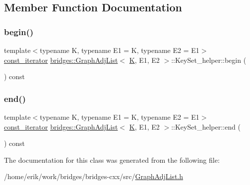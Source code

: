 \subsection{Member Function Documentation}
\mbox{\label{classbridges_1_1_graph_adj_list_1_1_key_set__helper_a13d241840008e50b94b3d12fbd897ebd}} 
\subsubsection{\texorpdfstring{begin()}{begin()}}
{\footnotesize\ttfamily template$<$typename K, typename E1 = K, typename E2 = E1$>$ \\
\hyperlink{classbridges_1_1_graph_adj_list_1_1_key_set__helper_1_1const__iterator}{const\+\_\+iterator} \hyperlink{classbridges_1_1_graph_adj_list}{bridges\+::\+Graph\+Adj\+List}$<$ \hyperlink{namespacebridges_acfb0a4f7877d8f63de3e6862004c50edaa5f3c6a11b03839d46af9fb43c97c188}{K}, E1, E2 $>$\+::Key\+Set\+\_\+helper\+::begin (\begin{DoxyParamCaption}{ }\end{DoxyParamCaption}) const\hspace{0.3cm}{\ttfamily [inline]}}

\mbox{\label{classbridges_1_1_graph_adj_list_1_1_key_set__helper_a581dd1d192896998e9d24bfa694c9036}} 
\subsubsection{\texorpdfstring{end()}{end()}}
{\footnotesize\ttfamily template$<$typename K, typename E1 = K, typename E2 = E1$>$ \\
\hyperlink{classbridges_1_1_graph_adj_list_1_1_key_set__helper_1_1const__iterator}{const\+\_\+iterator} \hyperlink{classbridges_1_1_graph_adj_list}{bridges\+::\+Graph\+Adj\+List}$<$ \hyperlink{namespacebridges_acfb0a4f7877d8f63de3e6862004c50edaa5f3c6a11b03839d46af9fb43c97c188}{K}, E1, E2 $>$\+::Key\+Set\+\_\+helper\+::end (\begin{DoxyParamCaption}{ }\end{DoxyParamCaption}) const\hspace{0.3cm}{\ttfamily [inline]}}



The documentation for this class was generated from the following file\+:\begin{DoxyCompactItemize}
\item 
/home/erik/work/bridges/bridges-\/cxx/src/\hyperlink{_graph_adj_list_8h}{Graph\+Adj\+List.\+h}\end{DoxyCompactItemize}
